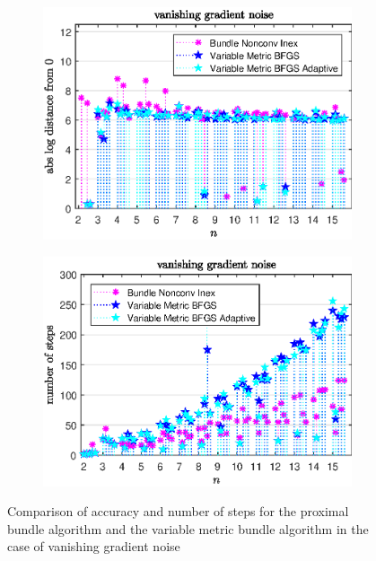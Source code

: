 \begin{figure}[H]
	\begin{subfigure}{0.49\textwidth}
		\includegraphics[width=\textwidth]{Pictures/Plots/vanishing_gradient_noise.eps}%
	\end{subfigure}
	\begin{subfigure}{0.49\textwidth}
		\includegraphics[width=\textwidth]{Pictures/Plots/steps_vanishing_gradient_noise.eps}%
	\end{subfigure}
	\caption{Comparison of accuracy and number of steps for the proximal bundle algorithm and the variable metric bundle algorithm in the case of vanishing gradient noise}%
	\label{fig_van_grad_noise}%
\end{figure}



